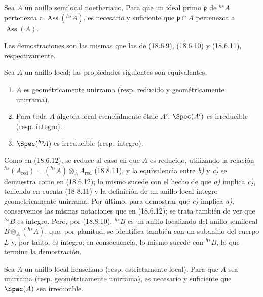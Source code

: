 \begin{corollary}[18.8.14]
\label{IV.18.8.14}
Sea $A$ un anillo semilocal noetheriano. Para que un ideal primo $\mathfrak p$ de ${}^{hs}\!A$ pertenezca a $\operatorname{Ass}({}^{hs}\!A)$, es necesario y suficiente que $\mathfrak p\cap A$ pertenezca a $\operatorname{Ass}(A)$.
\end{corollary}

Las demostraciones son las mismas que las de (18.6.9), (18.6.10) y (18.6.11), respectivamente.

\begin{proposition}[18.8.15]
\label{IV.18.8.15}
Sea $A$ un anillo local; las propiedades siguientes son equivalentes:
\begin{enumerate}
  \item[\textup{a)}] $A$ es geométricamente unirrama \textup{(resp.} reducido y geométricamente unirrama\textup{)}.
  \item[\textup{b)}] Para toda $A$-álgebra local esencialmente étale $A'$, $\Spec(A')$ es irreducible \textup{(resp.} íntegro\textup{)}.
  \item[\textup{c)}] $\Spec({}^{hs}\!A)$ es irreducible \textup{(resp.} íntegro\textup{)}.
\end{enumerate}
\end{proposition}

Como en (18.6.12), se reduce al caso en que $A$ es reducido, utilizando la relación ${}^{hs}(A_{\mathrm{red}})=({}^{hs}\!A)\otimes_A A_{\mathrm{red}}$ (18.8.11), y la equivalencia entre \emph{b)} y \emph{c)} se demuestra como en (18.6.12); lo mismo sucede con el hecho de que \emph{a)} implica \emph{c)}, teniendo en cuenta (18.8.11) y la definición de un anillo local íntegro geométricamente unirrama. Por último, para demostrar que \emph{c)} implica \emph{a)}, conservemos las mismas notaciones que en (18.6.12); se trata también de ver que ${}^{hs}\!B$ es íntegro. Pero, por (18.8.10), ${}^{hs}\!B$ es un anillo localizado del anillo semilocal $B\otimes_A({}^{hs}\!A)$, que, por planitud, se identifica también con un subanillo del cuerpo $L$ y, por tanto, es íntegro; en consecuencia, lo mismo sucede con ${}^{hs}\!B$, lo que termina la demostración.

\begin{corollary}[18.8.16]
\label{IV.18.8.16}
Sea $A$ un anillo local henseliano \textup{(resp.} estrictamente local\textup{)}. Para que $A$ sea unirrama \textup{(resp.} geométricamente unirrama\textup{)}, es necesario y suficiente que $\Spec(A)$ sea irreducible.
\end{corollary}

